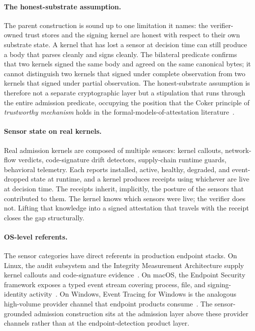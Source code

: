 \paragraph{The honest-substrate assumption.}
The parent construction is sound up to one limitation it names: the verifier-owned trust stores and the signing kernel are honest with respect to their own substrate state. A kernel that has lost a sensor at decision time can still produce a body that parses cleanly and signs cleanly. The bilateral predicate confirms that two kernels signed the same body and agreed on the same canonical bytes; it cannot distinguish two kernels that signed under complete observation from two kernels that signed under partial observation. The honest-substrate assumption is therefore not a separate cryptographic layer but a stipulation that runs through the entire admission predicate, occupying the position that the Coker principle of \emph{trustworthy mechanism} holds in the formal-models-of-attestation literature~\cite{cokerPrinciplesRemoteAttestation2011}.

\paragraph{Sensor state on real kernels.}
Real admission kernels are composed of multiple sensors: kernel callouts, network-flow verdicts, code-signature drift detectors, supply-chain runtime guards, behavioral telemetry. Each reports installed, active, healthy, degraded, and event-dropped state at runtime, and a kernel produces receipts using whichever are live at decision time. The receipts inherit, implicitly, the posture of the sensors that contributed to them. The kernel knows which sensors were live; the verifier does not. Lifting that knowledge into a signed attestation that travels with the receipt closes the gap structurally.

\paragraph{OS-level referents.}
The sensor categories have direct referents in production endpoint stacks. On Linux, the audit subsystem and the Integrity Measurement Architecture supply kernel callouts and code-signature evidence~\cite{linuxAuditSubsystem,sailerIMA2004}. On macOS, the Endpoint Security framework exposes a typed event stream covering process, file, and signing-identity activity~\cite{applePlatformSecurity2024}. On Windows, Event Tracing for Windows is the analogous high-volume provider channel that endpoint products consume~\cite{microsoftETW}. The sensor-grounded admission construction sits at the admission layer above these provider channels rather than at the endpoint-detection product layer.

